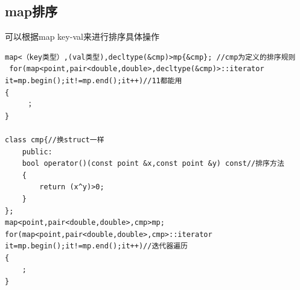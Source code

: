 \documentclass[12pt, a4paper, oneside]{ctexart}
\begin{document}
\newpage 
\subsection{map排序} 
可以根据map key-val来进行排序具体操作
\begin{lstlisting}
map<（key类型）,(val类型),decltype(&cmp)>mp{&cmp}; //cmp为定义的排序规则
 for(map<point,pair<double,double>,decltype(&cmp)>::iterator it=mp.begin();it!=mp.end();it++)//11都能用
{
     ；
}

class cmp{//换struct一样
    public:
    bool operator()(const point &x,const point &y) const//排序方法
    {
        return (x^y)>0;
    }
};
map<point,pair<double,double>,cmp>mp;
for(map<point,pair<double,double>,cmp>::iterator it=mp.begin();it!=mp.end();it++)//迭代器遍历
{   
    ;
}
\end{lstlisting}
\end{document}
